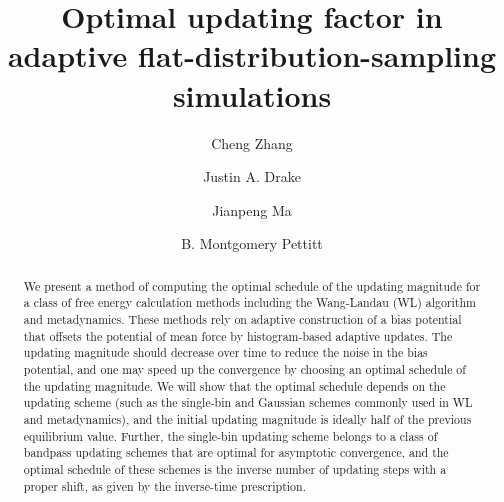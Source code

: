 \documentclass[reprint, superscriptaddress, floatfix]{revtex4-1}
\begin{document}
\title{Optimal updating factor in adaptive flat-distribution-sampling simulations}

\author{Cheng Zhang}
\author{Justin A. Drake}
\author{Jianpeng Ma}
\author{B. Montgomery Pettitt}



\begin{abstract}
  We present a method of computing the optimal schedule
  of the updating magnitude
  for a class of free energy calculation methods including
  the Wang-Landau (WL) algorithm and metadynamics.
  These methods rely on adaptive construction of
  a bias potential that offsets
  the potential of mean force by histogram-based adaptive updates.
  The updating magnitude should decrease over time
  to reduce the noise in the bias potential,
  and one may speed up the convergence by choosing an optimal schedule
  of the updating magnitude.
  We will show that
  the optimal schedule depends on the updating scheme
  (such as the single-bin and Gaussian schemes commonly used in WL and metadynamics),
  and the initial updating magnitude is ideally half of
  the previous equilibrium value.
  Further,
  the single-bin updating scheme
  belongs to a class of bandpass updating schemes
  that are optimal for asymptotic convergence,
  and the optimal schedule of these schemes
  is the inverse number of updating steps with a proper shift,
  as given by the inverse-time prescription.
\end{abstract}

\maketitle
\end{document}
